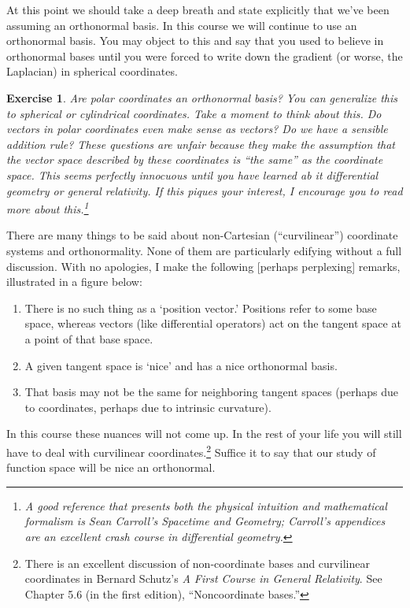 \documentclass[
  11pt,
	colorful,
	raggedright,
]{tufte-style-thesis-flip}
\newtheorem{exercise}{Exercise}[section]
\begin{document}
At this point we should take a deep breath and state explicitly that we’ve been assuming an orthonormal basis. In this course we will continue to use an orthonormal basis. You may object to this and say that you used to believe in orthonormal bases until you were forced to write down the gradient (or worse, the Laplacian) in spherical coordinates.

\begin{exercise}
Are polar coordinates an orthonormal basis? You can generalize this to spherical or cylindrical coordinates. Take a moment to think about this. Do vectors in polar coordinates even make sense as vectors? Do we have a sensible addition rule? These questions are unfair because they make the assumption that the vector space described by these coordinates is ``the same'' as the coordinate space. This seems perfectly innocuous until you have learned ab it differential geometry or general relativity. If this piques your interest, I encourage you to read more about this.\footnote{A good reference that presents both the physical intuition and mathematical formalism is Sean Carroll's \emph{Spacetime and Geometry}; Carroll's appendices are an excellent crash course in differential geometry.}
\end{exercise}


There are many things to be said about non-Cartesian (``curvilinear'') coordinate systems and orthonormality. None of them are particularly edifying without a full discussion. With no apologies, I make the following [perhaps perplexing] remarks, illustrated in a figure below:
\begin{enumerate}
\item There is no such thing as a `position vector.' Positions refer to some base space, whereas vectors (like differential operators) act on the tangent space at a point of that base space. 
\item A given tangent space is `nice’ and has a nice orthonormal basis. 
\item That basis may not be the same for neighboring tangent spaces (perhaps due to coordinates, perhaps due to intrinsic curvature). 
\end{enumerate}
In this course these nuances will not come up. In the rest of your life you will still have to deal with curvilinear coordinates.\footnote{There is an excellent discussion of non-coordinate bases and curvilinear coordinates in Bernard Schutz's \emph{A First Course in General Relativity}. See Chapter 5.6 (in the first edition), ``Noncoordinate bases.''} Suffice it to say that our study of function space will be nice an orthonormal. %
\end{document}
